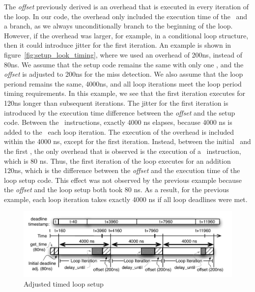 The \emph{offset} previously derived is an overhead that is executed in every iteration of the loop.
In our code, the overhead only included the execution time of the \delayuntil\ and a branch, as we always unconditionally branch to the beginning of the loop. 
However, if the overhead was larger, for example, in a conditional loop structure, then it could introduce jitter for the first iteration. 
An example is shown in figure~\ref{fig:setup_look_timing}, where we used an overhead of 200ns, instead of 80ns.
We assume that the setup code remains the same with only one \gettime, and the \emph{offset} is adjusted to 200ns for the miss detection.
We also assume that the loop periond remains the same, 4000ns, and all loop iterations meet the loop period timing requirements. 
In this example, we see that the first iteration executes for 120ns longer than subsequent iterations.
The jitter for the first iteration is introduced by the execution time difference between the \emph{offset} and the setup code.  
Between the \delayuntil\ instructions, exactly 4000 ns elapses, because 4000 ns is added to the \deadlinet\ each loop iteration.   
The execution of the overhead is included within the 4000 ns, except for the first iteration. 
Instead, between the initial \deadlinet\ and the first \delayuntil, the only overhead that is observed is the execution of a \gettime\ instruction, which is 80 ns. 
Thus, the first iteration of the loop executes for an addition 120ns, which is the difference between the \emph{offset} and the execution time of the loop setup code.
This effect was not observed by the previous example because the \emph{offset} and the loop setup both took 80 ns.
As a result, for the previous example, each loop iteration takes exactly 4000 ns if all loop deadlines were met.   

\begin{figure}[h]
  \vspace{-3mm}
  \begin{center}
    \includegraphics[scale=.9]{figs/setup_loop_timing_adj}
  \end{center}
  \vspace{-10mm}
  \caption{Adjusted timed loop setup}
  \label{fig:setup_look_timing_adj}
\end{figure}  
  
